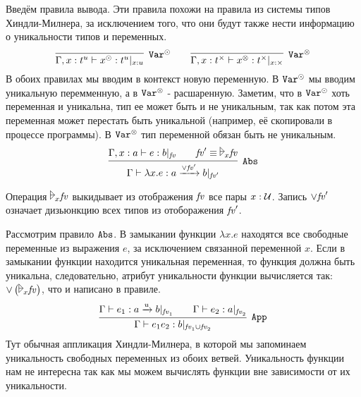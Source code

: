 Введём правила вывода. Эти правила похожи на правила из системы типов Хиндли-Милнера,
за исключением того, что они будут также нести информацию о уникальности типов и переменных.
\[
	\infer[\ruleVarU]{\Gamma, x : t^u \vdash x^\odot : t^u |_{x:u}}{} \qquad
	\infer[\ruleVarS]{\Gamma, x : t^\times \vdash x^\otimes : t^\times |_{x:\times}}{}
\]
В обоих правилах мы вводим в контекст новую переменную.
В $\mathtt{Var^\odot}$ мы вводим уникальную перемменную, а в $\mathtt{Var^\otimes}$ - расшаренную.
Заметим, что в $\mathtt{Var^\odot}$ хоть переменная и уникальна, тип ее может быть и не уникальным,
так как потом эта переменная может перестать быть уникальной (например, её скопировали в процессе программы).
В $\mathtt{Var^\otimes}$ тип переменной обязан быть не уникальным.
\[
	\infer[\ruleAbs]
		{\Gamma \vdash \lambda x.e : a \xrightarrow{\vee \fv'} b |_{\fv'}}
		{\Gamma, x : a \vdash e : b |_{\fv} && \fv' \equiv \fuck_x \fv} \\
\]

Операция $\fuck_x \fv$ выкидывает из отображения $\mathit{fv}$ все пары $x : \operatorname{\mathcal{U}}$.
Запись $\vee \mathit{fv}'$ означает дизьюнкцию всех типов из отоборажения $\mathit{fv}'$.

Рассмотрим правило $\mathtt{Abs}$.
В замыкании функции $\lambda x.e$ находятся все свободные переменные из выражения $e$, за исключением связанной переменной $x$.
Если в замыкании функции находится уникальная переменная, то функция должна быть уникальна, следовательно,
атрибут уникальности функции вычисляется так: $\vee \left( \fuck_x \fv \right)$, что и написано в правиле.
\[
	\infer[\ruleApp]
		{\Gamma \vdash e_1e_2 : b |_{\fv_1 \cup \fv_2}}
		{\Gamma \vdash e_1 : a \xrightarrow{u} b |_{\fv_1} \qquad \Gamma \vdash e_2 : a |_{\fv_2}}
\]
Тут обычная аппликация Хиндли-Милнера, в которой мы запоминаем уникальность свободных переменных из обоих ветвей.
Уникальность функции нам не интересна так как мы можем вычислять функции вне зависимости от их уникальности.


